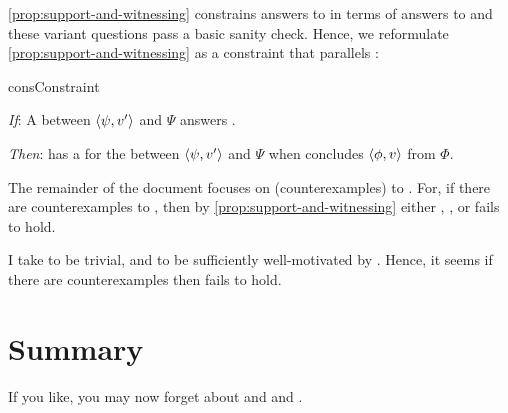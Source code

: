 \begin{note}
  \autoref{prop:support-and-witnessing} constrains answers to \qWhyV{} in terms of answers to \qHowV{} and these variant questions pass a basic sanity check.
  Hence, we reformulate \autoref{prop:support-and-witnessing} as a constraint that parallels \issueInclusion{}:

  \begin{constraint}{consConstraint}{\issueConstraint{}}
    \vspace{-\baselineskip}
    \begin{itenum}
    \item[\emph{If}:]
      A \ros{} between \(\langle \psi, v' \rangle\) and \(\Psi\) answers \qWhyV{}.
    \item[\emph{Then}:]
      \vAgent{} has a \wit{} for the \ros{} between \(\langle \psi, v' \rangle\) and \(\Psi\) when \vAgent{} concludes \(\langle \phi, v \rangle\) from \(\Phi\).
    \end{itenum}
    \vspace{-\baselineskip}
  \end{constraint}

  \noindent%
  The remainder of the document focuses on (counterexamples) to \issueConstraint{}.
  For, if there are counterexamples to \issueConstraint{}, then by \autoref{prop:support-and-witnessing} either \linkW{}, \linkH{}, or \issueInclusion{} fails to hold.

  I take \linkH{} to be trivial, and \linkW{} to be sufficiently well-motivated by \progEx{}.
  Hence, it seems if there are counterexamples then \issueInclusion{} fails to hold.
\end{note}




\section*{Summary}

\begin{note}
  If you like, you may now forget about \qWhy{} and \qHow{} and \issueInclusion{}.
\end{note}




